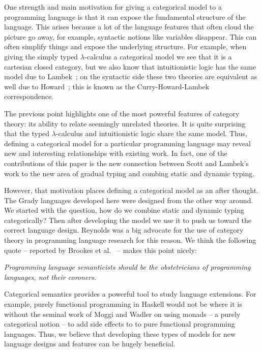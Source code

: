 One strength and main motivation for giving a categorical model to a
programming language is that it can expose the fundamental structure
of the language.  This arises because a lot of the language features
that often cloud the picture go away, for example, syntactic notions
like variables disappear.  This can often simplify things and expose
the underlying structure.  For example, when giving the simply typed
$\lambda$-calculus a categorical model we see that it is a cartesian
closed category, but we also know that intuitionistic logic has the
same model due to Lambek~\cite{Lambek:1980}; on the syntactic side
these two theories are equivalent as well due to
Howard~\cite{Howard:1980}; this is known as the Curry-Howard-Lambek
correspondence.

The previous point highlights one of the most powerful features of
category theory: its ability to relate seemingly unrelated theories.
It is quite surprising that the typed $\lambda$-calculus and
intuitionistic logic share the same model.  Thus, defining a
categorical model for a particular programming language may reveal new
and interesting relationships with existing work.  In fact, one of the
contributions of this paper is the new connection between Scott and
Lambek's work to the new area of gradual typing and combing static and
dynamic typing.

However, that motivation places defining a categorical model as an
after thought.  The Grady languages developed here were designed from
the other way around.  We started with the question, how do we combine
static and dynamic typing categorically? Then after developing the
model we use it to push us toward the correct language design.
Reynolds \cite{Brookes:2013} was a big advocate for the use of
category theory in programming language research for this reason.  We
think the following quote -- reported by Brookes et
al.~\cite{Brookes:2013} -- makes this point nicely:
\begin{center}
  \parbox{170pt}{
    \emph{Programming language semanticists should be the obstetricians
    of programming languages, not their coroners.\\
    {}}}
\end{center}

Categorical semantics provides a powerful tool to study language
extensions.  For example, purely functional programming in Haskell
would not be where it is without the seminal work of Moggi and Wadler
\cite{Moggi:1989,Wadler:1995} on using monads -- a purely categorical
notion -- to add side effects to to pure functional programming
languages.  Thus, we believe that developing these types of models for
new language designs and features can be hugely beneficial.

